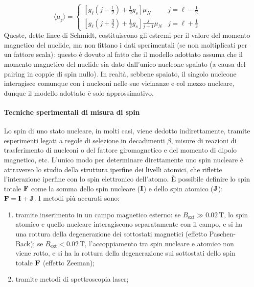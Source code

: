 \begin{equation}
	\langle \mu_z \rangle =
	\begin{cases}
		\left[ g_{\ell} \left( j - \frac{1}{2} \right) + \frac{1}{2} g_s \right] \mu_N & j = \ell - \frac{1}{2} \\
		\left[ g_{\ell} \left( j + \frac{3}{2} \right) + \frac{1}{2} g_s \right] \frac{j}{j + 1} \mu_N & j = \ell + \frac{1}{2}
	\end{cases}
	\label{eq:1.41}
\end{equation}
Queste, dette linee di Schmidt, costituiscono gli estremi per il valore del momento magnetico del nuclide, ma non fittano i dati sperimentali (se non moltiplicati per un fattore scala): questo è dovuto al fatto che il modello adottato assuma che il momento magnetico del nuclide sia dato dall'unico nucleone spaiato (a causa del pairing in coppie di spin nullo). In realtà, sebbene spaiato, il singolo nucleone interagisce comunque con i nucleoni nelle sue vicinanze e col mezzo nucleare, dunque il modello adottato è solo approssimativo.

\paragraph{Tecniche sperimentali di misura di spin} 
Lo spin di uno stato nucleare, in molti casi, viene dedotto indirettamente, tramite esperimenti legati a regole di selezione in decadimenti $\beta$, misure di reazioni di trasferimento di nucleoni o del fattore giromagnetico e del momento di dipolo magnetico, etc. L'unico modo per determinare direttamente uno spin nucleare è attraverso lo studio della struttura iperfine dei livelli atomici, che riflette l'interazione iperfine con lo spin elettronico dell'atomo. È possibile definire lo spin totale $\mathbf{F}$ come la somma dello spin nucleare ($\mathbf{I}$) e dello spin atomico ($\mathbf{J}$): $\mathbf{F}= \mathbf{I} + \mathbf{J}$. I metodi più accurati sono:
\begin{enumerate}
	\item tramite inserimento in un campo magnetico esterno: se $B_{\text{ext}} \gg 0.02 \, \text{T}$, lo spin atomico e quello nucleare interagiscono separatamente con il campo, e si ha una rottura della degenerazione dei sottostati magnetici (effetto Paschen-Back); se $B_\text{{ext}} < 0.02 \, \text{T}$, l'accoppiamento tra spin nucleare e atomico non viene rotto, e si ha la rottura della degenerazione sui sottostati dello spin totale $\mathbf{F}$ (effetto Zeeman);
	\item tramite metodi di spettroscopia laser;
  \end{enumerate}

